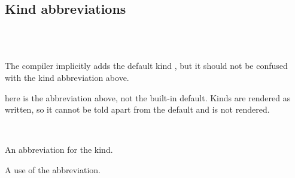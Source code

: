 \subsection{Kind abbreviations\label{Oxcaml--kind-abbreviations_2}}%
\label{Oxcaml--module-M_shadow_value}\label{Oxcaml-M_shadow_value}\begin{ocamlindent}\label{Oxcaml-M_shadow_value--kind-value}\\
\label{Oxcaml-M_shadow_value--type-t_unannotated}\\
\label{Oxcaml-M_shadow_value--val-poly_unannotated}\begin{ocamlindent}The compiler implicitly adds the default kind , but it should not be confused with the kind abbreviation above.\end{ocamlindent}%
\medbreak
\label{Oxcaml-M_shadow_value--type-t}\begin{ocamlindent} here is the abbreviation above, not the built-in default. Kinds are rendered as written, so it cannot be told apart from the default and is not rendered.\end{ocamlindent}%
\medbreak
\end{ocamlindent}%
\\
\label{Oxcaml--kind-plain_value}\begin{ocamlindent}An abbreviation for the  kind.\end{ocamlindent}%
\medbreak
\label{Oxcaml--type-t_plain_value}\begin{ocamlindent}A use of the  abbreviation.\end{ocamlindent}%
